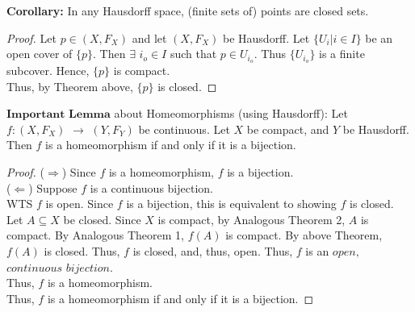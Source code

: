\documentclass[11pt,reqno]{amsart}
\theoremstyle{definition}
\begin{document}
     \textbf{Corollary:} In any Hausdorff space, (finite sets of) points are closed sets.\\
     \begin{proof} Let $p \in (X, F_X)$ and let $(X, F_X)$ be Hausdorff. Let $\{ U_i|i \in I\}$ be an open cover of $\{ p\}$. Then $\exists$ $i_o \in I$ such that $p \in U_{i_o}$. Thus $\{ U_{i_o} \}$ is a finite subcover. Hence, $\{ p \}$ is compact.\\
     \indent
     Thus, by Theorem above, $\{ p\}$ is closed.
     \end{proof}
     
     $\textbf{Important Lemma}$ about Homeomorphisms (using Hausdorff): Let\\ $f \colon (X, F_X)$ $\to$ $(Y, F_Y)$ be continuous. Let $X$ be compact, and $Y$ be Hausdorff. Then $f$ is a homeomorphism if and only if it is a bijection.\\
     \begin{proof}
     ($\Rightarrow$) Since $f$ is a homeomorphism, $f$ is a bijection.\\
     ($\Leftarrow$) Suppose $f$ is a continuous bijection.\\
     \indent
     WTS $f$ is open. Since $f$ is a bijection, this is equivalent to showing $f$ is closed.\\
     \indent
     Let $A \subseteq X$ be closed. Since $X$ is compact, by Analogous Theorem 2, $A$ is compact. By Analogous Theorem 1, $f(A)$ is compact. By above Theorem, $f(A)$ is closed. Thus, $f$ is closed, and, thus, open. Thus, $f$ is an $open,$ $continuous$ $bijection$.\\
     \indent
     Thus, $f$ is a homeomorphism.\\
     \indent
     Thus, $f$ is a homeomorphism if and only if it is a bijection.
     \end{proof}
     
\end{document}
